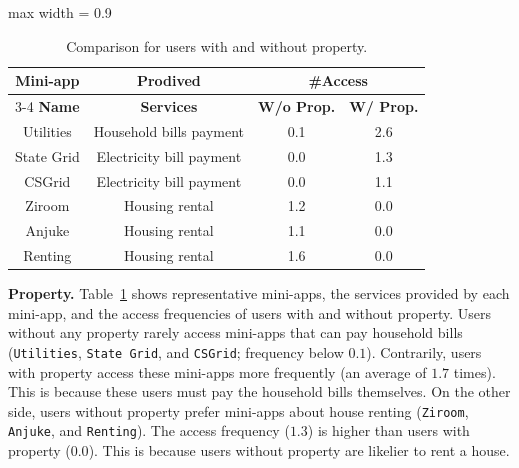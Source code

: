 \begin{table}[t]
\centering
\caption{Comparison for users with and without property.}
\vspace{-0.5em}
\label{tab:property}
\begin{adjustbox}{max width = 0.9\columnwidth}
\begin{tabular}{@{}cccc@{}}
\hline
\textbf{Mini-app} & \textbf{Prodived} & \multicolumn{2}{c}{\textbf{\#Access}} \\ \cline{3-4} 
\textbf{Name} & \textbf{Services} & \textbf{W/o Prop.} & \textbf{W/ Prop.} \\ \hline
Utilities & Household bills payment & 0.1 & 2.6 \\
State Grid & Electricity bill payment & 0.0 & 1.3 \\
CSGrid & Electricity bill payment & 0.0 & 1.1 \\
Ziroom & Housing rental & 1.2 & 0.0 \\
Anjuke & Housing rental & 1.1 & 0.0 \\
Renting & Housing rental & 1.6 & 0.0 \\ \hline
\end{tabular}
\end{adjustbox}
\end{table}

\noindent \textbf{Property.} 
Table~\ref{tab:property} shows representative mini-apps, the services provided by each mini-app, and the access
frequencies of users with and without property. Users without any
property rarely access mini-apps that can pay household bills (\eg \texttt{Utilities}, \texttt{State Grid},
and \texttt{CSGrid}; frequency below $0.1$). Contrarily, users with property access these mini-apps more frequently (an average of $1.7$ times). This is because
these users must pay the household bills themselves.
% 
On the other side, users without property prefer mini-apps about
house renting (\eg \texttt{Ziroom}, \texttt{Anjuke}, and \texttt{Renting}). The access frequency ($1.3$) is higher than users with property ($0.0$). This is because users without property are likelier to rent a
house.




